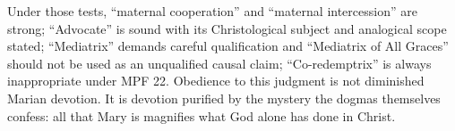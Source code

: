 Under those tests, ``maternal cooperation'' and ``maternal intercession'' are strong; ``Advocate'' is sound with its Christological subject and analogical scope stated; ``Mediatrix'' demands careful qualification and ``Mediatrix of All Graces'' should not be used as an unqualified causal claim; ``Co-redemptrix'' is always inappropriate under MPF 22. Obedience to this judgment is not diminished Marian devotion. It is devotion purified by the mystery the dogmas themselves confess: all that Mary is magnifies what God alone has done in Christ.

